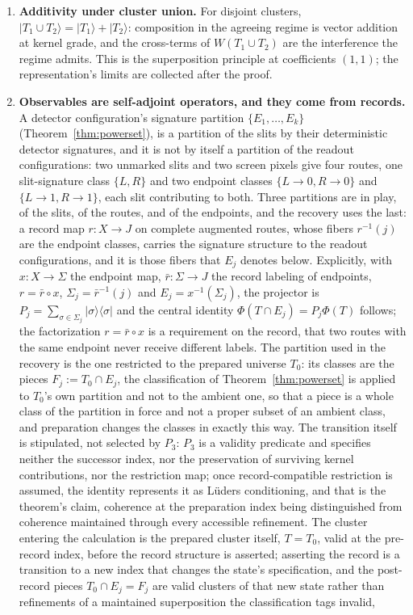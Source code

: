 \begin{theorem}
\begin{enumerate}
\item[(ii)] \textbf{Additivity under cluster union.} For disjoint clusters, $|T_1 \cup T_2\rangle = |T_1\rangle + |T_2\rangle$: composition in the agreeing regime is vector addition at kernel grade, and the cross-terms of $W(T_1 \cup T_2)$ are the interference the regime admits. This is the superposition principle at coefficients $(1,1)$; the representation's limits are collected after the proof. \item[(iii)] \textbf{Observables are self-adjoint operators, and they come from records.} A detector configuration's signature partition $\{E_1, \ldots, E_k\}$ (Theorem~\ref{thm:powerset}), is a partition of the slits by their deterministic detector signatures, and it is not by itself a partition of the readout configurations: two unmarked slits and two screen pixels give four routes, one slit-signature class $\{L, R\}$ and two endpoint classes $\{L \to 0, R \to 0\}$ and $\{L \to 1, R \to 1\}$, each slit contributing to both. Three partitions are in play, of the slits, of the routes, and of the endpoints, and the recovery uses the last: a record map $r : X \to J$ on complete augmented routes, whose fibers $r^{-1}(j)$ are the endpoint classes, carries the signature structure to the readout configurations, and it is those fibers that $E_j$ denotes below. Explicitly, with $x : X \to \Sigma$ the endpoint map, $\bar r : \Sigma \to J$ the record labeling of endpoints, $r = \bar r \circ x$, $\Sigma_j = \bar r^{-1}(j)$ and $E_j = x^{-1}(\Sigma_j)$, the projector is $P_j = \sum_{\sigma \in \Sigma_j} |\sigma\rangle\langle \sigma|$ and the central identity $\Phi(T \cap E_j) = P_j \Phi(T)$ follows; the factorization $r = \bar r \circ x$ is a requirement on the record, that two routes with the same endpoint never receive different labels. The partition used in the recovery is the one restricted to the prepared universe $T_0$: its classes are the pieces $F_j := T_0 \cap E_j$, the classification of Theorem~\ref{thm:powerset} is applied to $T_0$'s own partition and not to the ambient one, so that a piece is a whole class of the partition in force and not a proper subset of an ambient class, and preparation changes the classes in exactly this way. The transition itself is stipulated, not selected by $P_3$: $P_3$ is a validity predicate and specifies neither the successor index, nor the preservation of surviving kernel contributions, nor the restriction map; once record-compatible restriction is assumed, the identity represents it as L\"uders conditioning, and that is the theorem's claim, coherence at the preparation index being distinguished from coherence maintained through every accessible refinement. The cluster entering the calculation is the prepared cluster itself, $T = T_0$, valid at the pre-record index, before the record structure is asserted; asserting the record is a transition to a new index that changes the state's specification, and the post-record pieces $T_0 \cap E_j = F_j$ are valid clusters of that new state rather than refinements of a maintained superposition the classification tags invalid, 
\end{enumerate}
\end{theorem}
